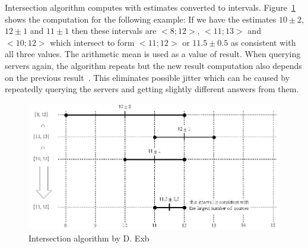 Intersection algorithm computes with estimates converted to intervals.
Figure~\ref{fig:ntp-intersection} shows the computation for the following example:
If we have the estimates $10 \pm 2$, $12 \pm 1$ and $11 \pm 1$
then these intervals are $<8; 12>$, $<11; 13>$ and $<10; 12>$ which
intersect to form $<11; 12>$ or $11.5 \pm 0.5$ as consistent with all three values.
The arithmetic mean is used as a value of result.
When querying servers again, the algorithm repeats but the new result computation
also depends on the previous result~\cite{rfc5905}.
This eliminates possible jitter which can be caused by repeatedly querying the servers
and getting slightly different answers from them.

\begin{figure}
	\centering
	\includegraphics[width=13cm,keepaspectratio]{fig/Marzullo_example-1.jpg}
	\caption{Intersection algorithm by D. Exb}
	\label{fig:ntp-intersection}
	\bigskip
\end{figure}

